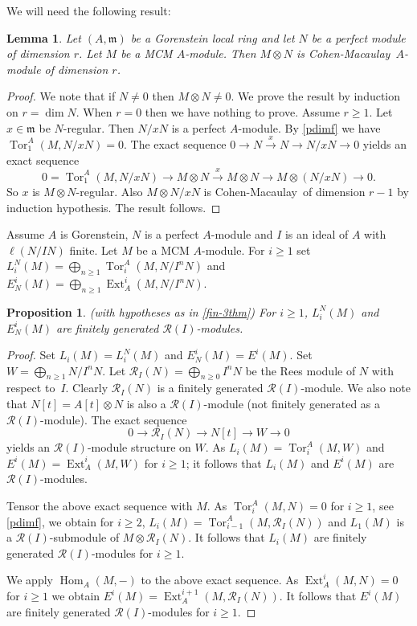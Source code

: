 \documentclass{amsart}
\newcommand{\CM}{Cohen-Macaulay}
\newcommand{\wrt}{with respect to}
\newcommand{\m}{\mathfrak{m} }
\newcommand{\R}{\mathcal{R} }
\newcommand{\rt}{\rightarrow}
\newcommand{\Tor}{\operatorname{Tor}}
\newcommand{\Hom}{\operatorname{Hom}}
\newcommand{\Ext}{\operatorname{Ext}}
\theoremstyle{plain}
\newtheorem{lemma}[theorem]{Lemma}
\newtheorem{proposition}[theorem]{Proposition}
\theoremstyle{definition}
\theoremstyle{remark}
\begin{document}
We will need the following result:
\begin{lemma}\label{perf-tensor}
Let $(A,\m)$ be a Gorenstein local ring and let $N$ be a perfect module of dimension $r$. Let $M$ be a MCM $A$-module. Then $M\otimes N$ is \CM \ $A$-module of dimension $r$.
\end{lemma}
\begin{proof}
We note that if $N \neq 0$ then $M\otimes N \neq 0$. We prove the result by induction on $r = \dim N$. When $r = 0$ then we have nothing to prove.
Assume $r \geq 1$. Let $x\in \m$ be $N$-regular. Then $N/xN$ is a perfect $A$-module. By \ref{pdimf} we have $\Tor^A_1(M, N/xN) = 0$. The exact sequence
$0 \rt N \xrightarrow{x} N \rt N/xN \rt 0$ yields an exact sequence
$$0 = \Tor^A_1(M, N/xN) \rt M\otimes N \xrightarrow{x} M\otimes N  \rt M\otimes (N/xN) \rt 0. $$
So $x$ is $M\otimes N$-regular. Also $M\otimes N/xN$ is \CM \ of dimension $r-1$ by induction hypothesis. The result follows.
\end{proof}
\s \label{fin-3thm} Assume $A$ is Gorenstein, $N$ is a perfect $A$-module and $I$ is an ideal of $A$ with $\ell(N/IN)$ finite. Let $M$ be a MCM $A$-module.
For $i \geq 1$
set $L_i^N(M) = \bigoplus_{n \geq 1}\Tor^A_i(M, N/I^{n}N)$ and $E^i_N(M) = \bigoplus_{n \geq 1}\Ext_A^i(M, N/I^{n}N)$.
\begin{proposition}\label{rachel}
(with hypotheses as in \ref{fin-3thm}) For $i \geq 1$, $L_i^N(M)$ and $E^i_N(M)$ are finitely generated $\R(I)$-modules.
\end{proposition}
\begin{proof}
Set $L_i(M) = L_i^N(M)$ and $E_N^i(M) = E^i(M)$.
  Set $W = \bigoplus_{n \geq 1}N/I^{n}N$. Let $\R_I(N) = \bigoplus_{n \geq 0}I^nN$ be the Rees module of $N$ \wrt \ $I$. Clearly $\R_I(N)$ is a finitely generated $\R(I)$-module. We also note that $N[t] = A[t]\otimes N$ is also a $\R(I)$-module (not finitely generated as a $\R(I)$-module). The exact sequence
  $$ 0 \rt \R_I(N) \rt N[t] \rt W \rt 0$$
  yields an $\R(I)$-module structure on  $W$. As $L_i(M) = \Tor^A_i(M, W)$ and $E^i(M) = \Ext_A^i(M, W)$ for $i \geq 1$; it follows that  $L_i(M)$ and $E^i(M)$ are $\R(I)$-modules.

  Tensor the above exact sequence with $M$. As $\Tor^A_i(M, N) = 0 $ for $i \geq 1$, see \ref{pdimf},  we obtain   for $i \geq 2$,  $L_i(M) = \Tor^A_{i-1}(M, \R_I(N))$ and $L_1(M)$ is a $\R(I)$-submodule of $M\otimes \R_I(N)$. It follows that
  $L_i(M)$  are finitely generated $\R(I)$-modules for $i \geq 1$.

  We apply $\Hom_A(M, -)$ to the above exact sequence. As $\Ext^i_A(M, N) = 0$ for $i \geq 1$ we obtain $E^i(M) = \Ext^{i+1}_A(M, \R_I(N))$. It follows that
  $E^i(M)$ are finitely generated $\R(I)$-modules for $i \geq 1$.
\end{proof}
\end{document}
